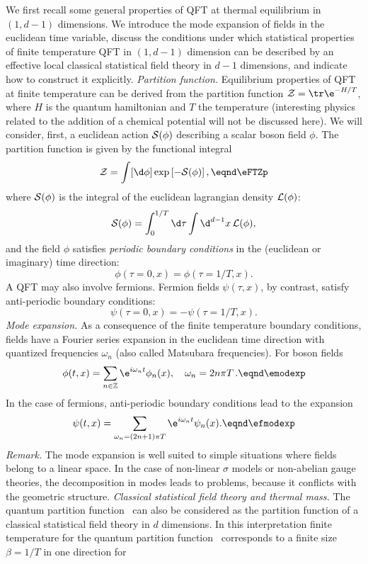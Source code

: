 We first recall some general properties of QFT at thermal equilibrium in $(1,d-1)$ dimensions. We introduce the mode expansion of fields in the euclidean time variable, discuss the conditions under which statistical properties of finite temperature QFT in $(1,d-1)$ dimension can be described by an effective local classical statistical field theory in $d-1$ dimensions, and indicate how to construct it explicitly.
%
\smallskip
{\it Partition function.} Equilibrium properties of QFT
at finite temperature can be derived from the partition function ${\cal Z}=\tr\e^{-H/T}$, where $H$ is the quantum hamiltonian   and $T$ the
temperature (interesting physics related to the addition of
a chemical potential will not be discussed here).
 We will consider,
first,  a  euclidean action ${\cal S}(\phi)$ describing a scalar
boson field $\phi$. The partition function is given by the
functional integral
$${\cal Z}=\int[\d\phi]\exp\left[-{\cal S}(\phi)\right],\eqnd\eFTZp$$
where  ${\cal S}(\phi)$ is the integral of the euclidean
lagrangian density ${\cal L}(\phi)$:
$${\cal S}(\phi)=\int_0^{1/T}\d\tau\int\d^{d-1} x\,{\cal L}(\phi), $$
and the field $\phi$ satisfies {\it periodic boundary conditions}  in
the (euclidean or imaginary) time direction:
$$\phi(\tau=0,x)=\phi(\tau=1/T,x).$$
A QFT may also involve fermions. Fermion fields
$\psi(\tau,x)$, by contrast, satisfy anti-periodic boundary conditions:
$$ \psi(\tau=0,x)=-\psi(\tau=1/T,x).$$
\smallskip
{\it Mode expansion.} As a consequence of the finite temperature boundary conditions, fields have a
Fourier series expansion in the euclidean time direction with quantized
frequencies $\omega_n$ (also called Matsubara frequencies). For boson fields
$$\phib(t,x)=\sum_{n\in {\Bbb Z}}\e^{i\omega_n t}\phib_n(x) ,
\quad \omega_n=2n\pi T\,.
\eqnd\emodexp $$
In the case of fermions, anti-periodic boundary conditions lead to the expansion
$$\psib(t,x)=\sum_{\omega_n=(2n+1)\pi T}\e^{i\omega_n t}\psib_n
(x).\eqnd\efmodexp $$
\smallskip
{\it Remark.} The mode expansion \eqns{\emodexp} is well suited to simple situations where fields belong to a linear space. In the case of
non-linear $\sigma $ models or non-abelian gauge theories, the decomposition in modes leads to problems, because it conflicts with the geometric structure.
\medskip
{\it Classical statistical field theory and thermal mass.}  The quantum partition function \eFTZp\ can also be considered as the partition
function of a classical statistical field theory in $d$ dimensions. In this interpretation finite temperature for the quantum partition function  \eFTZp\ corresponds to a finite size $ \beta =1/T$ in one direction for

